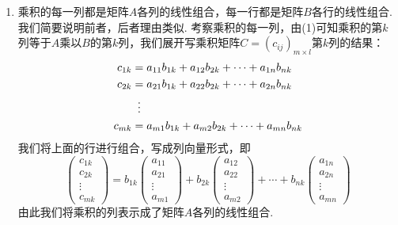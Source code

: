 \begin{enumerate}
\begin{enumerate}
              \item 乘积的每一列都是矩阵$A$各列的线性组合，每一行都是矩阵$B$各行的线性组合. 我们简要说明前者，后者理由类似. 考察乘积的每一列，由(1)可知乘积的第$k$列等于$A$乘以$B$的第$k$列，我们展开写乘积矩阵$C=(c_{ij})_{m\times l}$第$k$列的结果：
                    \begin{align*}
                        c_{1k} & =a_{11}b_{1k}+a_{12}b_{2k}+\cdots+a_{1n}b_{nk} \\
                        c_{2k} & =a_{21}b_{1k}+a_{22}b_{2k}+\cdots+a_{2n}b_{nk} \\
                               & \vdotswithin{=}                                \\
                        c_{mk} & =a_{m1}b_{1k}+a_{m2}b_{2k}+\cdots+a_{mn}b_{nk}
                    \end{align*}
                    我们将上面的行进行组合，写成列向量形式，即
                    \[\begin{pmatrix}
                            c_{1k} \\ c_{2k} \\ \vdots \\ c_{mk}
                        \end{pmatrix}=b_{1k}\begin{pmatrix}
                            a_{11} \\ a_{21} \\ \vdots \\ a_{m1}
                        \end{pmatrix}+b_{2k}\begin{pmatrix}
                            a_{12} \\ a_{22} \\ \vdots \\ a_{m2}
                        \end{pmatrix}+\cdots+b_{nk}\begin{pmatrix}
                            a_{1n} \\ a_{2n} \\ \vdots \\ a_{mn}
                        \end{pmatrix}\]
                    由此我们将乘积的列表示成了矩阵$A$各列的线性组合.
          \end{enumerate}


\end{enumerate}
